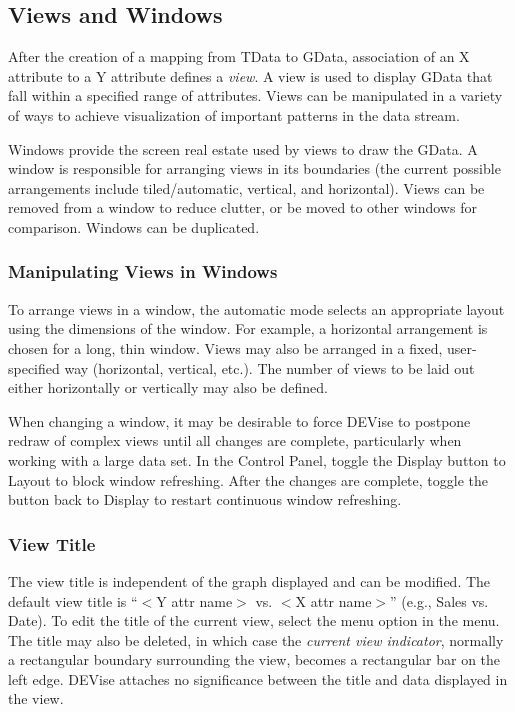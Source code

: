 
\subsection{Views and Windows}

After the creation of a mapping from TData to GData, association of an X
attribute to a Y attribute defines a {\em view}. A view is used to display GData
that fall within a specified range of attributes. Views can be manipulated in a
variety of ways to achieve visualization of important patterns in the data
stream.

Windows provide the screen real estate used by views to draw the GData. A window
is responsible for arranging views in its boundaries (the current possible
arrangements include tiled/automatic, vertical, and horizontal). Views can be
removed from a window to reduce clutter, or be moved to other windows for
comparison. Windows can be duplicated.

\subsubsection{Manipulating Views in Windows}

To arrange views in a window, the automatic mode selects an appropriate layout
using the dimensions of the window. For example, a horizontal arrangement is
chosen for a long, thin window. Views may also be arranged in a fixed,
user-specified way (horizontal, vertical, etc.). The number of views to be
laid out either horizontally or vertically may also be defined.

When changing a window, it may be desirable to force DEVise to postpone redraw
of complex views until all changes are complete, particularly when working with
a large data set. In the Control Panel, toggle the Display button to Layout
to block window refreshing. After the changes are complete, toggle the button
back to Display to restart continuous window refreshing.

\subsubsection{View Title}

The view title is independent of the graph displayed and can be modified. The
default view title is ``$<$Y attr name$>$ vs. $<$X attr name$>$'' (e.g.,
Sales vs.
Date). To edit the title of the current view, select the  menu
option in the  menu. The title may also be deleted, in which case the
{\em current view indicator}, normally a rectangular boundary surrounding the
view, becomes a rectangular bar on the left edge. DEVise attaches no
significance between the title and data displayed in the view.

